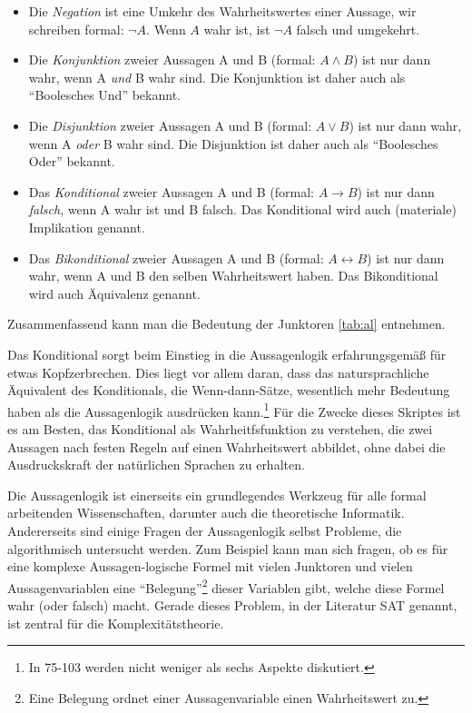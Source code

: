 \begin{itemize}
    \item Die \emph{Negation} ist eine Umkehr des Wahrheitswertes einer Aussage,
wir schreiben formal: $\neg A$. Wenn $A$ wahr ist, ist $\neg A$ falsch und umgekehrt.
        \item Die \emph{Konjunktion} zweier Aussagen A und B (formal: $A \wedge B$)
            ist nur dann wahr, wenn A \emph{und} B wahr sind.
            Die Konjunktion ist daher auch als ``Boolesches Und'' bekannt.
        \item Die \emph{Disjunktion} zweier Aussagen A und B (formal: $A \vee B$)
            ist nur dann wahr, wenn A \emph{oder} B wahr sind.
            Die Disjunktion ist daher auch als ``Boolesches Oder'' bekannt.
        \item Das \emph{Konditional} zweier Aussagen A und B (formal: $A \rightarrow B$)
            ist nur dann \emph{falsch}, wenn A wahr ist und B falsch.
            Das Konditional wird auch (materiale) Implikation genannt.
        \item Das \emph{Bikonditional} zweier Aussagen A und B (formal: $A \leftrightarrow B$)
            ist nur dann wahr, wenn A und B den selben Wahrheitswert haben.
            Das Bikonditional wird auch Äquivalenz genannt.
\end{itemize}
Zusammenfassend kann man die Bedeutung der Junktoren \autoref{tab:al} entnehmen.

Das Konditional sorgt beim Einstieg in die Aussagenlogik erfahrungsgemäß für etwas Kopfzerbrechen.
Dies liegt vor allem daran,
dass das natursprachliche Äquivalent des Konditionals, die Wenn-dann-Sätze,
wesentlich mehr Bedeutung haben als die Aussagenlogik ausdrücken kann.\footnote{
    In \cite{link} 75-103 werden nicht weniger als sechs Aspekte diskutiert.
}
Für die Zwecke dieses Skriptes ist es am Besten,
das Konditional als Wahrheitfsfunktion zu verstehen,
die zwei Aussagen nach festen Regeln auf einen Wahrheitswert abbildet,
ohne dabei die Ausdruckskraft der natürlichen Sprachen zu erhalten.

Die Aussagenlogik ist
einerseits ein grundlegendes Werkzeug für alle formal arbeitenden Wissenschaften,
darunter auch die theoretische Informatik.
Andererseits sind einige Fragen der Aussagenlogik selbst Probleme,
die algorithmisch untersucht werden.
Zum Beispiel kann man sich fragen,
ob es für eine komplexe Aussagen-logische Formel mit vielen Junktoren und vielen Aussagenvariablen
eine ``Belegung''\footnote{
    Eine Belegung ordnet einer Aussagenvariable einen Wahrheitswert zu.
} dieser Variablen gibt,
welche diese Formel wahr (oder falsch) macht.
Gerade dieses Problem, in der Literatur SAT genannt,
ist zentral für die Komplexitätstheorie.

